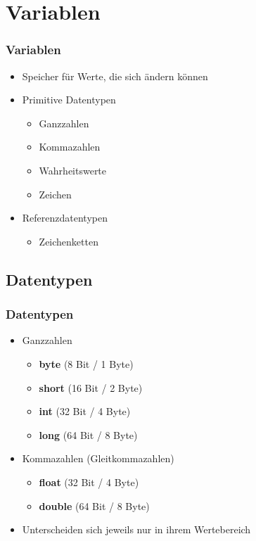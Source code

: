\documentclass[final]{beamer}
\newcommand{\keyWord}[1]{\textbf{#1}}
\begin{document}
\section{Variablen}
\begin{frame}
  \frametitle{Variablen}
  \begin{itemize}
    \item{Speicher für Werte, die sich ändern können}
    \item{Primitive Datentypen}
      \begin{itemize}
        \item{Ganzzahlen}
        \item{Kommazahlen}
        \item{Wahrheitswerte}
        \item{Zeichen}
      \end{itemize}
    \item{Referenzdatentypen}
      \begin{itemize}
        \item{Zeichenketten}
      \end{itemize}
  \end{itemize}
\end{frame}

\subsection{Datentypen}
\begin{frame}
  \frametitle{Datentypen}
  \begin{itemize}
    \item{Ganzzahlen}
    \begin{itemize}
      \item{\keyWord{byte} (8 Bit / 1 Byte)}
      \item{\keyWord{short} (16 Bit / 2 Byte)}
      \item{\keyWord{int} (32 Bit / 4 Byte)}
      \item{\keyWord{long} (64 Bit / 8 Byte)}
    \end{itemize}
    \item{Kommazahlen (Gleitkommazahlen)}
    \begin{itemize}
      \item{\keyWord{float} (32 Bit / 4 Byte)}
      \item{\keyWord{double} (64 Bit / 8 Byte)}
    \end{itemize}
  \end{itemize}
  \begin{itemize}
    \item{Unterscheiden sich jeweils nur in ihrem Wertebereich}
  \end{itemize}
\end{frame}
\end{document}
